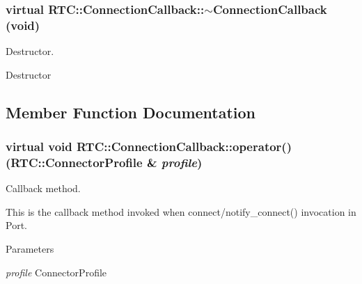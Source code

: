\subsubsection[{$\sim$ConnectionCallback}]{\setlength{\rightskip}{0pt plus 5cm}virtual RTC::ConnectionCallback::$\sim$ConnectionCallback (void)\hspace{0.3cm}{\ttfamily  [inline, virtual]}}\label{classRTC_1_1ConnectionCallback_a8ce9ddf57298521257e45003717763df}


Destructor. 

Destructor 

\subsection{Member Function Documentation}
\subsubsection[{operator()}]{\setlength{\rightskip}{0pt plus 5cm}virtual void RTC::ConnectionCallback::operator() (RTC::ConnectorProfile \& {\em profile})\hspace{0.3cm}{\ttfamily  [pure virtual]}}\label{classRTC_1_1ConnectionCallback_ab28717e4f965c2ddbf89eb4d5f27b0ac}


Callback method. 

This is the callback method invoked when connect/notify\_\-connect() invocation in Port.


\begin{DoxyParams}{Parameters}
\item[{\em profile}]ConnectorProfile \end{DoxyParams}
